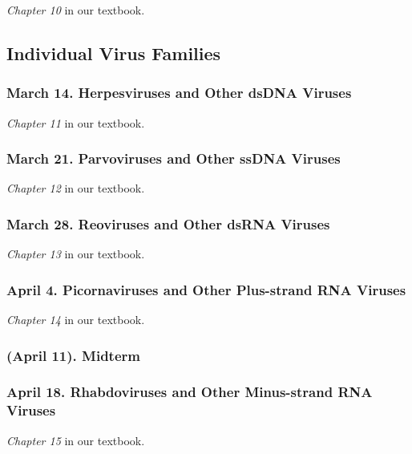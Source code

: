 \emph{Chapter 10} in our textbook.

\subsection{Individual Virus Families}\label{individual-virus-families}

\subsubsection{March 14. Herpesviruses and Other dsDNA
Viruses}\label{march-14.-herpesviruses-and-other-dsdna-viruses}

\emph{Chapter 11} in our textbook.

\subsubsection{March 21. Parvoviruses and Other ssDNA
Viruses}\label{march-21.-parvoviruses-and-other-ssdna-viruses}

\emph{Chapter 12} in our textbook.

\subsubsection{March 28. Reoviruses and Other dsRNA
Viruses}\label{march-28.-reoviruses-and-other-dsrna-viruses}

\emph{Chapter 13} in our textbook.

\subsubsection{April 4. Picornaviruses and Other Plus-strand RNA
Viruses}\label{april-4.-picornaviruses-and-other-plus-strand-rna-viruses}

\emph{Chapter 14} in our textbook.

\subsubsection{(April 11). Midterm}\label{april-11.-midterm}

\subsubsection{April 18. Rhabdoviruses and Other Minus-strand RNA
Viruses}\label{april-18.-rhabdoviruses-and-other-minus-strand-rna-viruses}

\emph{Chapter 15} in our textbook.

